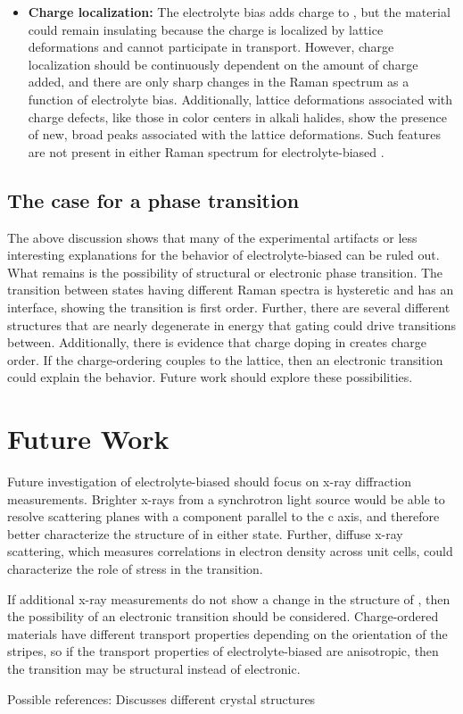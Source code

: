 \begin{itemize}
\item \textbf{Charge localization:} The electrolyte bias adds charge to \ruclnospace , but the material could remain insulating because the charge is localized by lattice deformations and cannot participate in transport. However, charge localization should be continuously dependent on the amount of charge added, and there are only sharp changes in the Raman spectrum as a function of electrolyte bias. Additionally, lattice deformations associated with charge defects, like those in color centers in alkali halides, show the presence of new, broad peaks associated with the lattice deformations. Such features are not present in either Raman spectrum for electrolyte-biased \ruclnospace .
\end{itemize}

\subsection{The case for a phase transition}

The above discussion shows that many of the experimental artifacts or less interesting explanations for the behavior of electrolyte-biased \rucl can be ruled out. What remains is the possibility of structural or electronic phase transition. The transition between states having different Raman spectra is hysteretic and has an interface, showing the transition is first order. Further, there are several different \rucl structures that are nearly degenerate in energy that gating could drive transitions between. Additionally, there is evidence that charge doping in \rucl creates charge order. If the charge-ordering couples to the lattice, then an electronic transition could explain the behavior. Future work should explore these possibilities.

\section{Future Work}

Future investigation of electrolyte-biased \rucl should focus on x-ray diffraction measurements. Brighter x-rays from a synchrotron light source would be able to resolve scattering planes with a component parallel to the c axis, and therefore better characterize the structure of \rucl in either state. Further, diffuse x-ray scattering, which measures correlations in electron density across unit cells, could characterize the role of stress in the transition.

If additional x-ray measurements do not show a change in the structure of \ruclnospace , then the possibility of an electronic transition should be considered. Charge-ordered materials have different transport properties depending on the orientation of the stripes, so if the transport properties of electrolyte-biased \rucl are anisotropic, then the transition may be structural instead of electronic.

Possible references:
Discusses different crystal structures